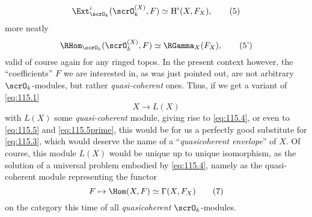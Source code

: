 \begin{equation}
  \label{eq:115.5}
  \Ext^i_{\scrO_k}(\scrO_k^{(X)},F) \simeq \mathrm H^i(X,F_X),\tag{5}
\end{equation}
more neatly
\begin{equation}
  \label{eq:115.5prime}
  \RHom_{\scrO_k}(\scrO_k^{(X)},F) \simeq \RGamma_X(F_X),\tag{5'}
\end{equation}
valid of course again for any ringed topos. In the present context
however, the ``coefficients'' $F$ we are interested in, as was just
pointed out, are not arbitrary $\scrO_k$-modules, but rather
\emph{quasi-coherent} ones. Thus, if we get a variant of
\eqref{eq:115.1}
\begin{equation}
  \label{eq:115.6}
  X\to L(X)\tag{6}
\end{equation}
with $L(X)$ some \emph{quasi-coherent} module, giving rise to
\eqref{eq:115.4}, or even to \eqref{eq:115.5} and
\eqref{eq:115.5prime}, this would be for us a perfectly good
substitute for \eqref{eq:115.3}, which would deserve the name of a
``\emph{quasicoherent envelope}'' of $X$. Of course, this
module $L(X)$ would be unique up to unique isomorphism, as the
solution of a universal problem embodied by \eqref{eq:115.4}, namely
as the quasi-coherent module representing the functor
\begin{equation}
  \label{eq:115.7}
  F\mapsto\Hom(X,F)\simeq\Gamma(X,F_X)\tag{7}
\end{equation}
on the category this time of all \emph{quasicoherent}
$\scrO_k$-modules.

